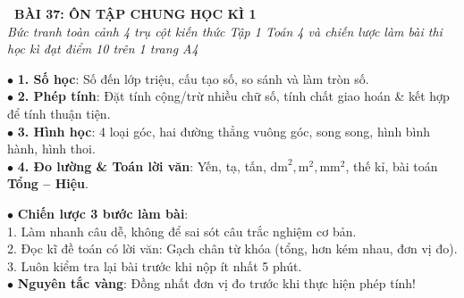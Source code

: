 \documentclass[14pt,a4paper,oneside]{extbook}
\begin{document}
\noindent
\begin{tcolorbox}[
  enhanced,
  colback=teal!8!white,
  colframe=teal!80!black,
  arc=3mm, boxrule=1pt,
  left=3mm, right=3mm, top=2mm, bottom=2mm,
  halign=center
]
  {\Large\bfseries\color{teal!90!black}\faBookmark\ BÀI 37: ÔN TẬP CHUNG HỌC KÌ 1}\\[1.5pt]
  {\footnotesize\itshape\color{black!75} Bức tranh toàn cảnh 4 trụ cột kiến thức Tập 1 Toán 4 và chiến lược làm bài thi học kì đạt điểm 10 trên 1 trang A4}
\end{tcolorbox}

\vspace{2mm}

\noindent
\begin{minipage}[t]{0.49\textwidth}
  \begin{tcolorbox}[
    enhanced,
    title={\footnotesize\bfseries\color{white}\faStar\ 1. Bốn trụ cột kiến thức Học kì 1},
    colback=blue!2!white,
    colframe=blue!75!black,
    arc=2.5mm, boxrule=0.8pt, top=1.8mm, bottom=1.8mm, left=2mm, right=2mm
  ]
    \footnotesize
    $\bullet$ \textbf{1. Số học}: Số đến lớp triệu, cấu tạo số, so sánh và làm tròn số.\\
    $\bullet$ \textbf{2. Phép tính}: Đặt tính cộng/trừ nhiều chữ số, tính chất giao hoán \& kết hợp để tính thuận tiện.\\
    $\bullet$ \textbf{3. Hình học}: 4 loại góc, hai đường thẳng vuông góc, song song, hình bình hành, hình thoi.\\
    $\bullet$ \textbf{4. Đo lường \& Toán lời văn}: Yến, tạ, tấn, $\text{dm}^2, \text{m}^2, \text{mm}^2$, thế kỉ, bài toán \textbf{Tổng -- Hiệu}.
  \end{tcolorbox}
\end{minipage}%
\hfill
\begin{minipage}[t]{0.49\textwidth}
  \begin{tcolorbox}[
    enhanced,
    title={\footnotesize\bfseries\color{white}\faLightbulbO\ 2. Chiến lược làm bài thi Học kì 1},
    colback=teal!2!white,
    colframe=teal!75!black,
    arc=2.5mm, boxrule=0.8pt, top=1.8mm, bottom=1.8mm, left=2mm, right=2mm
  ]
    \footnotesize
    $\bullet$ \textbf{Chiến lược 3 bước làm bài}:\\
    1. Làm nhanh câu dễ, không để sai sót câu trắc nghiệm cơ bản.\\
    2. Đọc kĩ đề toán có lời văn: Gạch chân từ khóa (tổng, hơn kém nhau, đơn vị đo).\\
    3. Luôn kiểm tra lại bài trước khi nộp ít nhất 5 phút.\\
    $\bullet$ \textbf{Nguyên tắc vàng}: Đồng nhất đơn vị đo trước khi thực hiện phép tính!
  \end{tcolorbox}
\end{minipage}
\end{document}
